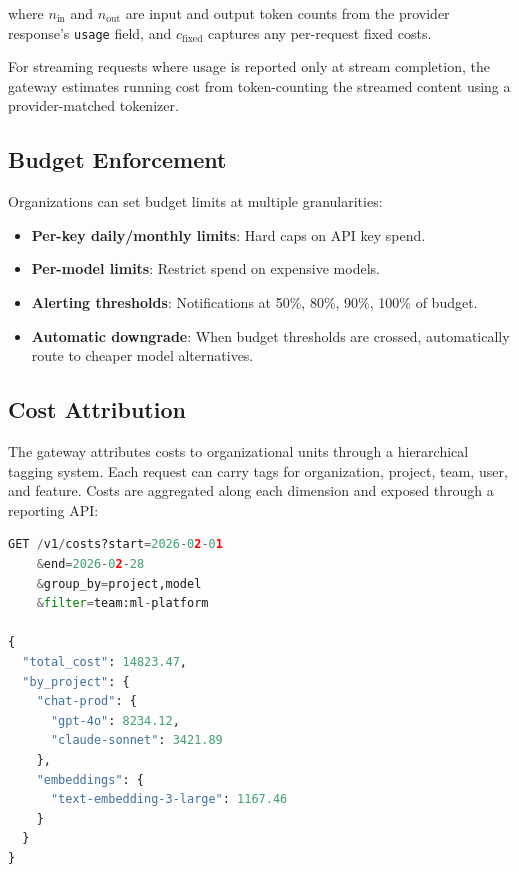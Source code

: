 where $n_{\text{in}}$ and $n_{\text{out}}$ are input and output token counts from the provider response's \texttt{usage} field, and $c_{\text{fixed}}$ captures any per-request fixed costs.

For streaming requests where usage is reported only at stream completion, the gateway estimates running cost from token-counting the streamed content using a provider-matched tokenizer.

\subsection{Budget Enforcement}

Organizations can set budget limits at multiple granularities:

\begin{itemize}[leftmargin=*]
    \item \textbf{Per-key daily/monthly limits}: Hard caps on API key spend.
    \item \textbf{Per-model limits}: Restrict spend on expensive models.
    \item \textbf{Alerting thresholds}: Notifications at 50\%, 80\%, 90\%, 100\% of budget.
    \item \textbf{Automatic downgrade}: When budget thresholds are crossed, automatically route to cheaper model alternatives.
\end{itemize}

\subsection{Cost Attribution}

The gateway attributes costs to organizational units through a hierarchical tagging system. Each request can carry tags for organization, project, team, user, and feature. Costs are aggregated along each dimension and exposed through a reporting API:

\begin{lstlisting}[language=Python, caption=Cost attribution query]
GET /v1/costs?start=2026-02-01
    &end=2026-02-28
    &group_by=project,model
    &filter=team:ml-platform

{
  "total_cost": 14823.47,
  "by_project": {
    "chat-prod": {
      "gpt-4o": 8234.12,
      "claude-sonnet": 3421.89
    },
    "embeddings": {
      "text-embedding-3-large": 1167.46
    }
  }
}
\end{lstlisting}

